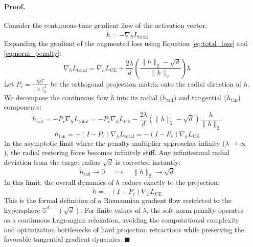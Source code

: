 \documentclass[11pt,a4paper]{article}
\begin{document}
\paragraph{Proof.} Consider the continuous-time gradient flow of the activation vector:
\begin{equation}
\dot{h} = -\nabla_h L_{\text{total}}
\end{equation}
Expanding the gradient of the augmented loss using Equation \ref{eq:total_loss} and \ref{eq:norm_penalty}:
\begin{equation}
\nabla_h L_{\text{total}} = \nabla_h L_{\text{CE}} + \frac{2\lambda}{d} \left( \frac{\|h\|_2 - \sqrt{d}}{\|h\|_2} \right) h
\end{equation}
Let $P_r = \frac{h h^T}{\|h\|_2^2}$ be the orthogonal projection matrix onto the radial direction of $h$. We decompose the continuous flow $\dot{h}$ into its radial ($\dot{h}_{\text{rad}}$) and tangential ($\dot{h}_{\text{tan}}$) components:
\begin{equation}
\dot{h}_{\text{rad}} = -P_r \nabla_h L_{\text{total}} = -P_r \nabla_h L_{\text{CE}} - \frac{2\lambda}{d} (\|h\|_2 - \sqrt{d}) \frac{h}{\|h\|_2}
\end{equation}
\begin{equation}
\dot{h}_{\text{tan}} = -(I - P_r) \nabla_h L_{\text{total}} = -(I - P_r) \nabla_h L_{\text{CE}}
\end{equation}
In the asymptotic limit where the penalty multiplier approaches infinity ($\lambda \to \infty$), the radial restoring force becomes infinitely stiff. Any infinitesimal radial deviation from the target radius $\sqrt{d}$ is corrected instantly:
\begin{equation}
\dot{h}_{\text{rad}} \to 0 \quad \implies \quad \|h\|_2 \to \sqrt{d}
\end{equation}
In this limit, the overall dynamics of $h$ reduce exactly to the projection:
\begin{equation}
\dot{h} = -(I - P_r) \nabla_h L_{\text{CE}}
\end{equation}
This is the formal definition of a Riemannian gradient flow restricted to the hypersphere $\mathbb{S}^{d-1}(\sqrt{d})$. For finite values of $\lambda$, the soft norm penalty operates as a continuous Lagrangian relaxation, avoiding the computational complexity and optimization bottlenecks of hard projection retractions while preserving the favorable tangential gradient dynamics. $\blacksquare$

\end{document}
